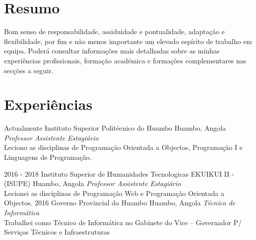\divider
\section{Resumo}
  \vspace{-0.2cm}
  
  Bom senso de responsabilidade, assiduidade e pontualidade, adaptação e flexibilidade, por fim e não menos importante um elevado espírito de trabalho em equipa. Poderá consultar informações mais detalhadas sobre as minhas experiências profissionais, formação académica e formações complementares nas secções a seguir.\\
  \divider

\section{Experiências}

\begin{entrada}

\lista
  {Actualmente}
  {Instituto Superior Politécnico do Huambo}
  {Huambo, Angola}
  {\textsf{\emph{Professor Assistente Estagiário}}\\
  \small{Leciono as disciplinas de Programação Orientada a Objectos}, Programação I e Linguagens de Programação.}

\lista
  {2016 - 2018}
  {Instituto Superior de Humanidades Tecnologicas EKUIKUI II - (ISUPE)}
  {Huambo, Angola}
  {\textsf{\emph{Professor Assistente Estagiário}}\\
  \small{Lecionei as disciplinas de Programação Web e Programação Orientada a Objectos.}}
\lista
  {2016}
  {Governo Provincial do Huambo}
  {Huambo, Angola}
  {\textsf{\emph{Técnico de Informática}}\\
  \small{Trabalhei como Técnico de Informática no Gabinete do Vice – Governador P/ Serviços Técnicos e Infraestruturas}}



\end{entrada}

